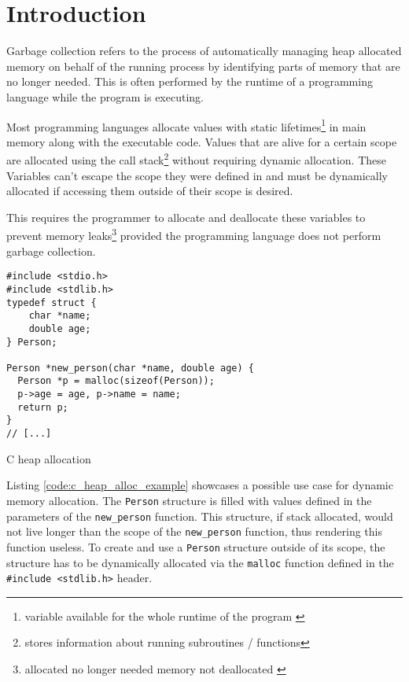 \section{Introduction}

Garbage collection refers to the process of automatically managing
heap allocated memory on behalf of the running process by
identifying parts of memory that are no longer needed. \cite[Introduction]{go_gcguide_2022}
This is often performed by the runtime of a programming language while the
program is executing. \cite[Introduction]{go_spec_2023}

Most programming languages allocate values with static
lifetimes\footnote{variable available for the whole runtime of the program
\cite[Abstract]{static-dynamic-scope_tanter_2009}} in main memory along with
the executable code. Values that are alive for a certain scope are allocated
using the call stack\footnote{stores information about running subroutines /
functions\cite[2.2 Call Stacks]{call-stack_mcmaster-memon_2006}} without
requiring dynamic allocation. These Variables can't escape the scope they were
defined in and must be dynamically allocated if accessing them outside of
their scope is desired.

This requires the programmer to allocate and deallocate these
variables to prevent memory leaks\footnote{allocated no longer needed memory
not deallocated \cite[1.2.1 A Practical Object Ownership
Model]{practical_heine-lam_2003}} provided the programming language does not
perform garbage collection. 

\begin{listing}[H] 
    \begin{verbatim} 
#include <stdio.h>
#include <stdlib.h>
typedef struct { 
    char *name;
    double age; 
} Person;

Person *new_person(char *name, double age) {
  Person *p = malloc(sizeof(Person));
  p->age = age, p->name = name;
  return p;
}
// [...]
    \end{verbatim}
    \caption{C heap allocation}
    \label{code:c_heap_alloc_example}
\end{listing}

Listing \autoref{code:c_heap_alloc_example} showcases a possible use case for
dynamic memory allocation. The \texttt{Person} structure is filled with values
defined in the parameters of the \texttt{new\_person} function. This structure,
if stack allocated, would not live longer than the scope of the
\texttt{new\_person} function, thus rendering this function useless. To create
and use a \texttt{Person} structure outside of its scope, the structure has to
be dynamically allocated via the \texttt{malloc} function defined in the
\texttt{#include <stdlib.h>} header.

